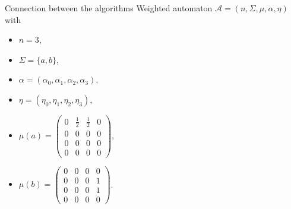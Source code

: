 \documentclass[rgb, pdf]{beamer}
\begin{document}
    
    \begin{frame}[allowframebreaks]{Connection between the algorithms}
         Weighted automaton $\mathcal{A} = (n, \Sigma, \mu, \alpha, \eta)$ with \\ \vspace{0.5cm}
            \begin{minipage}{0.27\textwidth}
                \begin{itemize}
                    \item $n = 3$,
                    \item $\Sigma = \{a, b\}$,
                    \item $\alpha = (\alpha_0,\alpha_1, \alpha_2, \alpha_3)$,
                    \item $\eta = (\eta_0,\eta_1, \eta_2, \eta_3)$,
                \end{itemize}
            \end{minipage} \begin{minipage}{0.28\textwidth}
             \begin{itemize}
                 \item $\mu(a) = \begin{pmatrix}
                                    0 & \frac{1}{2} & \frac{1}{2} & 0 \\
                                    0 & 0 & 0 & 0 \\
                                    0 & 0 & 0 & 0 \\
                                    0 & 0 & 0 & 0
                                \end{pmatrix}$, \vspace{0.2cm} \\
                    \item $\mu(b)= \begin{pmatrix}
                                    0 & 0 & 0 & 0 \\
                                    0 & 0 & 0 & 1 \\
                                    0 & 0 & 0 & 1 \\
                                    0 & 0 & 0 & 0
                                 \end{pmatrix}
                                $.
                \end{itemize}
            \end{minipage}
            \begin{minipage}{0.3\textwidth}
            \begin{center}

\end{center}
\end{minipage}
\end{frame}
\end{document}
